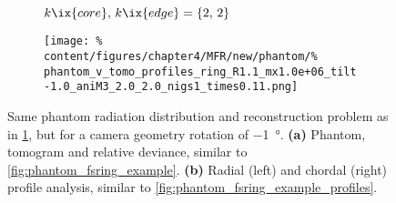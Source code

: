 %
            \begin{figure}[t]%
                \centering%
                \begin{subfigure}{\textwidth}%
                    \centering%
                    \caption{$k\ix{core},\,k\ix{edge}=\left\{2,\,2\right\}$}%
                \end{subfigure}%
                \newline%
                \begin{subfigure}{\textwidth}%
                    \centering%
                    \texttt{[image: \%
                        content/figures/chapter4/MFR/new/phantom/\%
                        phantom\_v\_tomo\_profiles\_ring\_R1.1\_mx1.0e+06\_tilt-1.0\_aniM3\_2.0\_2.0\_nigs1\_times0.11.png]}%
                    \caption{}%
                \end{subfigure}%
                \caption{Same phantom radiation distribution and reconstruction problem as in \cref{fig:phantom_fsring_tilt_-1deg}, but for a camera geometry rotation of \SI{-1}{\degree}. \textbf{(a)} Phantom, tomogram and relative deviance, similar to \cref{fig:phantom_fsring_example}. \textbf{(b)} Radial (left) and chordal (right) profile analysis, similar to \cref{fig:phantom_fsring_example_profiles}.}\label{fig:phantom_fsring_tilt_-1deg}%
            \end{figure}%
%
